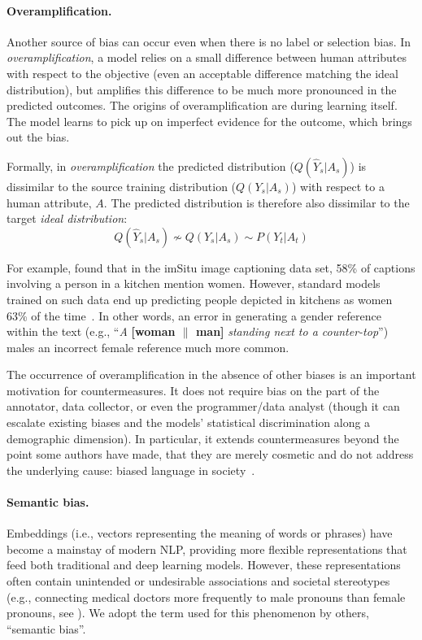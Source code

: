 \documentclass[11pt,a4paper]{article}
\begin{document}
\paragraph{Overamplification.}
Another source of bias can occur even when there is no label or selection bias. In \textit{overamplification}, a model relies on a small difference between human attributes with respect to the objective (even an acceptable difference matching the ideal distribution), but amplifies this difference to be much more pronounced in the predicted outcomes.
The origins of overamplification are during learning itself. The model learns to pick up on imperfect evidence for the outcome, which brings out the bias. 

Formally, in \textit{overamplification} the predicted distribution ($Q(\hat{Y}_s|A_s)$) is dissimilar to the source training distribution ($Q(Y_s|A_s)$) with respect to a human attribute, $A$. The predicted distribution is therefore also dissimilar to the target \textit{ideal distribution}:
$$Q(\hat{Y}_s|A_s) \nsim Q(Y_s|A_s) \sim P(Y_t|A_t)$$

For example,  found that in the imSitu image captioning data set, 58\% of captions involving a person in a kitchen mention women. However, standard models trained on such data end up predicting people depicted in kitchens as women 63\% of the time~\cite{zhao2017men}. 
In other words, an error in generating a gender reference within the text (e.g., ``\textit{A} \textbf{[woman $\|$ man]} \textit{standing next to a counter-top}'') males an incorrect female reference much more common.

The occurrence of overamplification in the absence of other biases is an important motivation for countermeasures. It does not require bias on the part of the annotator, data collector, or even the programmer/data analyst (though it can escalate existing biases and the models' statistical discrimination along a demographic dimension). In particular, it extends countermeasures beyond the point some authors have made, that they are merely cosmetic and do not address the underlying cause: biased language in society~\cite{gonen-goldberg-2019-lipstick-pig}. 


\paragraph{Semantic bias.} 
Embeddings (i.e., vectors representing the meaning of words or phrases) have become a mainstay of modern NLP, providing more flexible representations that feed both traditional and deep learning models.
However, these representations often contain unintended or undesirable associations and societal stereotypes (e.g., connecting medical doctors more frequently to male pronouns than female pronouns, see ). 
We adopt the term used for this phenomenon by others, ``semantic bias''.
\end{document}
